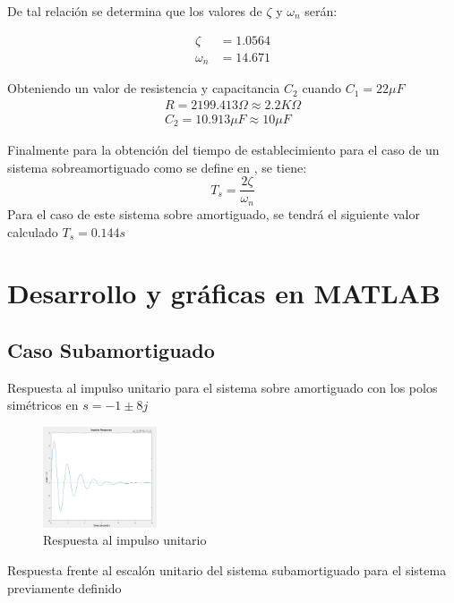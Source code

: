 \documentclass[conference]{IEEEtran}
\begin{document}
	De tal relación se determina que los valores de $\zeta$ y $\omega_n$ serán:
	
	\begin{align}
		\zeta &= 1.0564 \\
		\omega_n &= 14.671 
	\end{align}
	
	Obteniendo un valor de resistencia y capacitancia $C_2$ cuando $C_1 = 22 \mu F \label{eq:sobre-capacitancia-c1}$ 
	\begin{align}
		R = 2199.413 \Omega \approx 2.2K \Omega \label{eq:sobre-resistencia}\\ 
		C_2 = 10.913 \mu F \approx 10 \mu F \label{eq:sobre-capacitancia-c2}
	\end{align}	
	
	Finalmente para la obtención del tiempo de establecimiento para el caso de un sistema sobreamortiguado como se define en \cite{sistemas_segundo_orden}, se tiene:
	\begin{equation}
		T_s = \frac{2\zeta}{\omega_n}
		\label{eq:ts-sobreamortiguada}
	\end{equation}
	Para el caso de este sistema sobre amortiguado, se tendrá el siguiente valor calculado 
	$ T_s = 0.144s$ 
	
	\section{Desarrollo y gráficas en MATLAB}
	\subsection{Caso Subamortiguado}
	
	Respuesta al impulso unitario para el sistema sobre amortiguado con los polos simétricos en $ s = -1 \pm 8j$
	\begin{figure}[h]
		\centering
		\includegraphics[width=0.3\textwidth]{media/sub-impulso}
		\caption{Respuesta al impulso unitario}
		\label{fig:sub-impulso}
	\end{figure}
	
	Respuesta frente al escalón unitario del sistema subamortiguado para el sistema previamente definido
	
\end{document}
